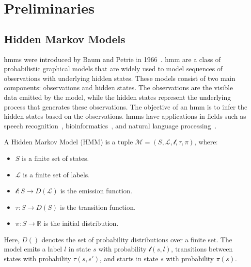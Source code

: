 \section{Preliminaries}\label{sec:preliminaries}

\subsection{Hidden Markov Models}\label{subsec:hmm}
\glspl{hmm} were introduced by Baum and Petrie in 1966~\cite{levinson1983introduction}.
\gls{hmm} are a class of probabilistic graphical models that are widely used to model sequences of observations with underlying hidden states.
These models consist of two main components: observations and hidden states.
The observations are the visible data emitted by the model, while the hidden states represent the underlying process that generates these observations.
The objective of an \gls{hmm} is to infer the hidden states based on the observations.
\glspl{hmm} have applications in fields such as speech recognition~\cite{chavan2013overview}, bioinformatics~\cite{de2007hidden}, and natural language processing~\cite{murveit1990integrating}.

\begin{definition}
    A Hidden Markov Model (HMM) is a tuple $\mathcal{M} = (S, \mathcal{L}, \mathscr{l}, \tau,  \pi)$, where:
    \begin{itemize}
        \item $S$ is a finite set of states.
        \item $\mathcal{L}$ is a finite set of labels.
        \item $\mathscr{l}: S \rightarrow D(\mathcal{L})$ is the emission function.
        \item $\tau: S \rightarrow D(S)$ is the transition function.
        \item $\pi: S \rightarrow \mathbb{R}$ is the initial distribution.
    \end{itemize}
\end{definition}

Here, $D()$ denotes the set of probability distributions over a finite set. The model emits a label $l$ in state $s$ with probability $\mathscr{l}(s, l)$, transitions between states with probability $\tau(s, s')$, and starts in state $s$ with probability $\pi(s)$.

